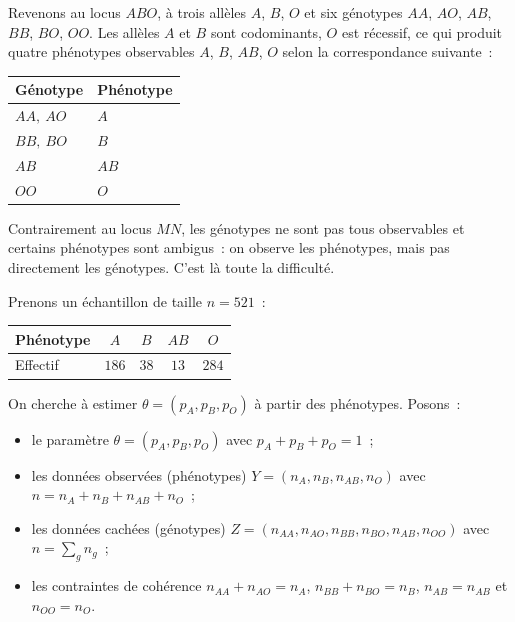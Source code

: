 \begin{exemple}
Revenons au locus $ABO$, à trois allèles $A$, $B$, $O$ et six génotypes $AA$,
$AO$, $AB$, $BB$, $BO$, $OO$. Les allèles $A$ et $B$ sont codominants, $O$ est
récessif, ce qui produit quatre phénotypes observables $A$, $B$, $AB$, $O$
selon la correspondance suivante~:

\begin{center}
\begin{tabular}{ll}
\hline
Génotype     & Phénotype \\
\hline
$AA,\ AO$    & $A$ \\
$BB,\ BO$    & $B$ \\
$AB$         & $AB$ \\
$OO$         & $O$ \\
\hline
\end{tabular}
\end{center}

Contrairement au locus $MN$, les génotypes ne sont pas tous observables et
certains phénotypes sont ambigus~: on observe les phénotypes, mais pas
directement les génotypes. C'est là toute la difficulté.

Prenons un échantillon de taille $n = 521$~:

\begin{center}
\begin{tabular}{lcccc}
\hline
Phénotype & $A$ & $B$ & $AB$ & $O$ \\
\hline
Effectif  & $186$ & $38$ & $13$ & $284$ \\
\hline
\end{tabular}
\end{center}

On cherche à estimer $\theta = (p_A, p_B, p_O)$ à partir des phénotypes. Posons~:
\begin{itemize}
  \item le paramètre $\theta = (p_A, p_B, p_O)$ avec $p_A + p_B + p_O = 1$~;
  \item les données observées (phénotypes)
        $Y = (n_A, n_B, n_{AB}, n_O)$ avec $n = n_A + n_B + n_{AB} + n_O$~;
  \item les données cachées (génotypes)
        $Z = (n_{AA}, n_{AO}, n_{BB}, n_{BO}, n_{AB}, n_{OO})$
        avec $n = \sum_g n_g$~;
  \item les contraintes de cohérence
        $n_{AA} + n_{AO} = n_A$, $n_{BB} + n_{BO} = n_B$,
        $n_{AB} = n_{AB}$ et $n_{OO} = n_O$.
\end{itemize}


\end{exemple}
